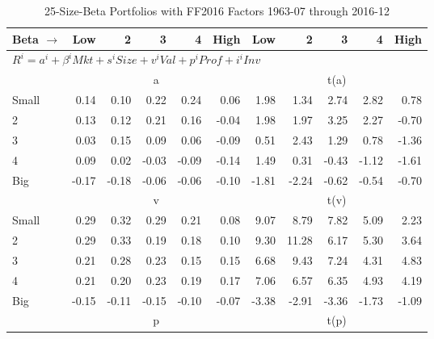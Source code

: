 
\begin{table}[!ht]
\centering
\caption{25-Size-Beta Portfolios with FF2016 Factors 1963-07 through 2016-12}
\begin{tabular}{lrrrrrrrrrr}
  \toprule
    Beta $\rightarrow$ & Low & 2 & 3 & 4 & High & Low & 2 & 3 & 4 & High \\ 
  \midrule
  \multicolumn{11}{l}{$R^i=a^i+\beta^iMkt+s^iSize+v^iVal+p^iProf+i^iInv$} \\

  
    
      & \multicolumn{5}{c}{a} & \multicolumn{5}{c}{t(a)}
    
    \\
      \cmidrule(r){2-6} \cmidrule(r){7-11}

    Small   & 0.14  & 0.10  & 0.22  & 0.24  & 0.06  & 1.98  & 1.34  & 2.74  & 2.82  & 0.78  \\
         2  & 0.13  & 0.12  & 0.21  & 0.16  & -0.04  & 1.98  & 1.97  & 3.25  & 2.27  & -0.70  \\
         3  & 0.03  & 0.15  & 0.09  & 0.06  & -0.09  & 0.51  & 2.43  & 1.29  & 0.78  & -1.36  \\
         4  & 0.09  & 0.02  & -0.03  & -0.09  & -0.14  & 1.49  & 0.31  & -0.43  & -1.12  & -1.61  \\
    Big     & -0.17  & -0.18  & -0.06  & -0.06  & -0.10  & -1.81  & -2.24  & -0.62  & -0.54  & -0.70  \\

  
    
      & \multicolumn{5}{c}{v} & \multicolumn{5}{c}{t(v)}
    
    \\
      \cmidrule(r){2-6} \cmidrule(r){7-11}

    Small   & 0.29  & 0.32  & 0.29  & 0.21  & 0.08  & 9.07  & 8.79  & 7.82  & 5.09  & 2.23  \\
         2  & 0.29  & 0.33  & 0.19  & 0.18  & 0.10  & 9.30  & 11.28  & 6.17  & 5.30  & 3.64  \\
         3  & 0.21  & 0.28  & 0.23  & 0.15  & 0.15  & 6.68  & 9.43  & 7.24  & 4.31  & 4.83  \\
         4  & 0.21  & 0.20  & 0.23  & 0.19  & 0.17  & 7.06  & 6.57  & 6.35  & 4.93  & 4.19  \\
    Big     & -0.15  & -0.11  & -0.15  & -0.10  & -0.07  & -3.38  & -2.91  & -3.36  & -1.73  & -1.09  \\

  
    
      & \multicolumn{5}{c}{p} & \multicolumn{5}{c}{t(p)}
    

\end{tabular}
\end{table}
